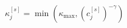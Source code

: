 \documentclass[border=1pt]{standalone}
\begin{document}
\color{navy}
\(\displaystyle
  \kappa_j^{[s]}=\min\!\left(\kappa_{\max},(c_j^{[s]})^{-\gamma}\right)
\)
\end{document}
